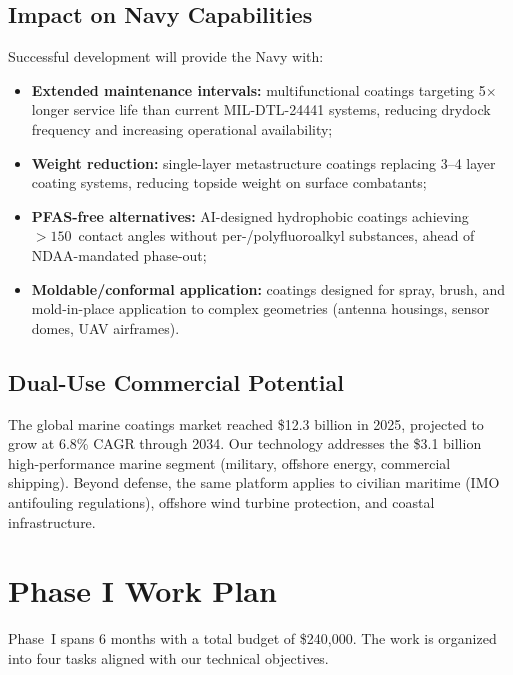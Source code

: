 \documentclass[11pt,letterpaper]{article}
\begin{document}
\subsection{Impact on Navy Capabilities}

Successful development will provide the Navy with:
\begin{itemize}[nosep]
  \item \textbf{Extended maintenance intervals:} multifunctional coatings
    targeting 5$\times$ longer service life than current MIL-DTL-24441 systems,
    reducing drydock frequency and increasing operational availability;
  \item \textbf{Weight reduction:} single-layer metastructure coatings replacing
    3--4 layer coating systems, reducing topside weight on surface combatants;
  \item \textbf{PFAS-free alternatives:} AI-designed hydrophobic coatings
    achieving $>150$\textdegree\ contact angles without per-/polyfluoroalkyl
    substances, ahead of NDAA-mandated phase-out;
  \item \textbf{Moldable/conformal application:} coatings designed for spray,
    brush, and mold-in-place application to complex geometries (antenna
    housings, sensor domes, UAV airframes).
\end{itemize}

\subsection{Dual-Use Commercial Potential}

The global marine coatings market reached \$12.3 billion in 2025, projected to
grow at 6.8\% CAGR through 2034. Our technology addresses the \$3.1 billion
high-performance marine segment (military, offshore energy, commercial shipping).
Beyond defense, the same platform applies to civilian maritime (IMO antifouling
regulations), offshore wind turbine protection, and coastal infrastructure.

\section{Phase I Work Plan}
\label{sec:workplan}

Phase~I spans 6 months with a total budget of \$240,000. The work is organized
into four tasks aligned with our technical objectives.
\end{document}
